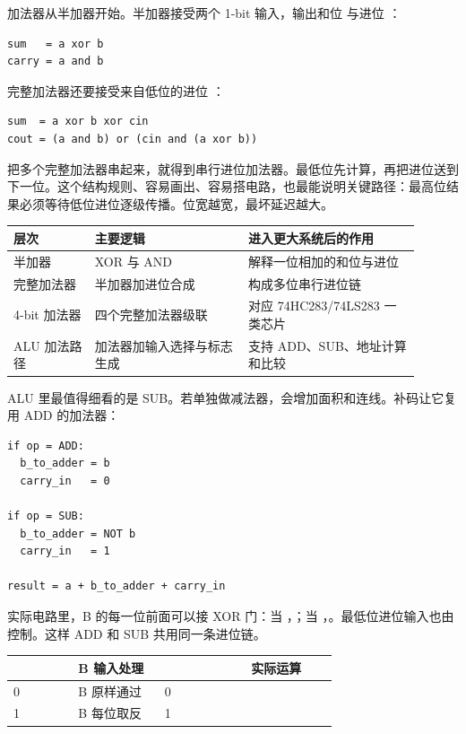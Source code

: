 加法器从半加器开始。半加器接受两个 1-bit 输入，输出和位  与进位 ：

\begin{lstlisting}
sum   = a xor b
carry = a and b
\end{lstlisting}

完整加法器还要接受来自低位的进位 ：

\begin{lstlisting}
sum  = a xor b xor cin
cout = (a and b) or (cin and (a xor b))
\end{lstlisting}

把多个完整加法器串起来，就得到串行进位加法器。最低位先计算，再把进位送到下一位。这个结构规则、容易画出、容易搭电路，也最能说明关键路径：最高位结果必须等待低位进位逐级传播。位宽越宽，最坏延迟越大。

\begin{longtable}{L{0.18\linewidth}L{0.34\linewidth}L{0.38\linewidth}}
\toprule
层次 & 主要逻辑 & 进入更大系统后的作用 \\
\midrule
半加器 & XOR 与 AND & 解释一位相加的和位与进位 \\
完整加法器 & 半加器加进位合成 & 构成多位串行进位链 \\
4-bit 加法器 & 四个完整加法器级联 & 对应 74HC283/74LS283 一类芯片 \\
ALU 加法路径 & 加法器加输入选择与标志生成 & 支持 ADD、SUB、地址计算和比较 \\
\bottomrule
\end{longtable}

ALU 里最值得细看的是 SUB。若单独做减法器，会增加面积和连线。补码让它复用 ADD 的加法器：

\begin{lstlisting}
if op = ADD:
  b_to_adder = b
  carry_in   = 0

if op = SUB:
  b_to_adder = NOT b
  carry_in   = 1

result = a + b_to_adder + carry_in
\end{lstlisting}

实际电路里，B 的每一位前面可以接 XOR 门：当 ，；当 ，。最低位进位输入也由  控制。这样 ADD 和 SUB 共用同一条进位链。

\begin{longtable}{L{0.18\linewidth}L{0.24\linewidth}L{0.24\linewidth}L{0.24\linewidth}}
\toprule
{} & B 输入处理 &  & 实际运算 \\
 & B 原样通过 & 0 &  \\
1 & B 每位取反 & 1 &  \\
\bottomrule
\end{longtable}

